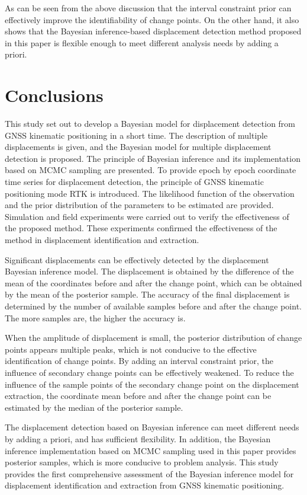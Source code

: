 \documentclass[final,3p,times]{elsarticle}
\begin{document}
	As can be seen from the above discussion that the interval constraint prior can effectively improve the identifiability of change points.
	On the other hand, it also shows that the Bayesian inference-based displacement detection method proposed in this paper is flexible enough to meet different analysis needs by adding a priori.
	
	\section{Conclusions}
	\label{concl}
	This study set out to develop a Bayesian model for displacement detection from GNSS kinematic positioning in a short time. 
	The description of multiple displacements is given, and the Bayesian model for multiple displacement detection is proposed.
	The principle of Bayesian inference and its implementation based on MCMC sampling are presented.
	To provide epoch by epoch coordinate time series for displacement detection, the principle of GNSS kinematic positioning mode RTK is introduced.
	The likelihood function of the observation and the prior distribution of the parameters to be estimated are provided.
	Simulation and field experiments were carried out to verify the effectiveness of the proposed method. 
	These experiments confirmed the effectiveness of the method in displacement identification and extraction.
	
	Significant displacements can be effectively detected by the displacement Bayesian inference model.
	The displacement is obtained by the difference of the mean of the coordinates before and after the change point, which can be obtained by the mean of the posterior sample.
	The accuracy of the final displacement is determined by the number of available samples before and after the change point.
	The more samples are, the higher the accuracy is.
	
	When the amplitude of displacement is small, the posterior distribution of change points appears multiple peaks, which is not conducive to the effective identification of change points.
	By adding an interval constraint prior, the influence of secondary change points can be effectively weakened.
	To reduce the influence of the sample points of the secondary change point on the displacement extraction, the coordinate mean before and after the change point can be estimated by the median of the posterior sample.
	
	The displacement detection based on Bayesian inference can meet different needs by adding a priori, and has sufficient flexibility.
	In addition, the Bayesian inference implementation based on MCMC sampling used in this paper provides posterior samples, which is more conducive to problem analysis.
	This study provides the first comprehensive assessment of the Bayesian inference model for displacement identification and extraction from GNSS kinematic positioning.
	
\end{document}
